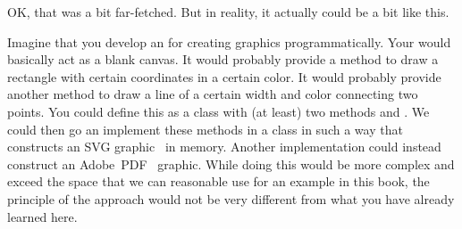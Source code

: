 OK, that was a bit far-fetched.
But in reality, it actually could be a bit like this.

Imagine that you develop an  for creating graphics programmatically.
Your  would basically act as a blank canvas.
It would probably provide a method to draw a rectangle with certain coordinates in a certain color.
It would probably provide another method to draw a line of a certain width and color connecting two points.
You could define this as a class with (at least) two methods  and .
We could then go an implement these methods in a class in such a way that constructs an SVG graphic~\cite{DDGLMSWFJJ2011SVGSSE} in memory.
Another implementation could instead construct an Adobe~PDF~\cite{A2024WDPM,A2008P3DMPDFP1P1} graphic.
While doing this would be more complex and exceed the space that we can reasonable use for an example in this book, the principle of the approach would not be very different from what you have already learned here.%
\endhsection%
%
\FloatBarrier%
\endhsection%
